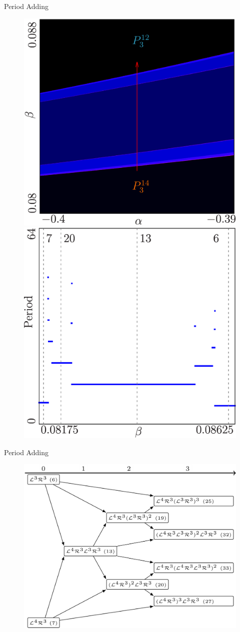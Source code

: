 \begin{frame}{Period Adding}
	\vspace{-1em}
	\begin{figure}
		\includegraphics[width=.4 \textwidth]{Figs/archetypal_model_halved_add_hor_2D.png}
		\quad
		\includegraphics[width=.4 \textwidth]{Figs/archetypal_model_halved_add_hor_1D.png}
	\end{figure}
\end{frame}

\begin{frame}{Period Adding}
	\vspace{-1em}
	\begin{figure}
		\includegraphics[width=.6 \textwidth]{Figs/Trees/HalvedArchetypal/adding.png}
	\end{figure}
\end{frame}

